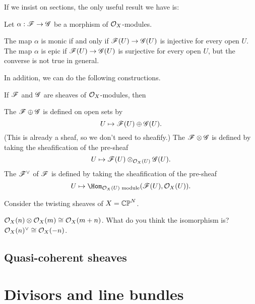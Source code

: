 \documentclass[11pt]{scrreprt}
\begin{document}
If we insist on sections, the only useful result we have is:
\begin{theorem}
	Let $\alpha : \mathscr F \to \mathscr G$ be a morphism of $\mathcal O_X$-modules.
	\begin{enumerate}[(a)]
		\ii The map $\alpha$ is monic if and only if $\mathscr F(U) \to \mathscr G(U)$
		is injective for every open $U$.
		\ii The map $\alpha$ is epic if $\mathscr F(U) \to \mathscr G(U)$
		is surjective for every open $U$,
		but the converse is not true in general.
	\end{enumerate}
\end{theorem}

In addition, we can do the following constructions.
\begin{definition}
	If $\mathscr F$ and $\mathscr G$ are sheaves of $\mathcal O_X$-modules, then
	\begin{enumerate}[(a)]
		\ii The  $\mathscr F \oplus \mathscr G$ is defined
		on open sets by \[ U \mapsto \mathscr F(U) \oplus \mathscr G(U). \]
		(This is already a sheaf, so we don't need to sheafify.)
		\ii The  $\mathscr F \otimes \mathscr G$ is defined
		by taking the sheafification of the pre-sheaf
		\[ U \mapsto \mathscr F(U) \otimes_{\mathcal O_X(U)} \mathscr G(U). \]
		\ii The  $\mathscr F^\vee$ of $\mathscr F$ is defined
		by taking the sheafification of the pre-sheaf
		\[ U \mapsto \Hom_{\OO_X(U) \text{ module}} (\SF(U), \OO_X(U)). \]
	\end{enumerate}
\end{definition}
\begin{example}
	Consider the twisting sheaves of $X = \mathbb{CP}^N$.
	\begin{enumerate}[(a)]
		\ii $\mathcal O_X(n) \otimes \mathcal O_X(m) \cong \mathcal O_X(m+n)$.
		What do you think the isomorphism is?
		\ii $\mathcal O_X(n)^\vee \cong \mathcal O_X(-n)$.
	\end{enumerate}
\end{example}

\section{Quasi-coherent sheaves}

\chapter{Divisors and line bundles}
\end{document}
